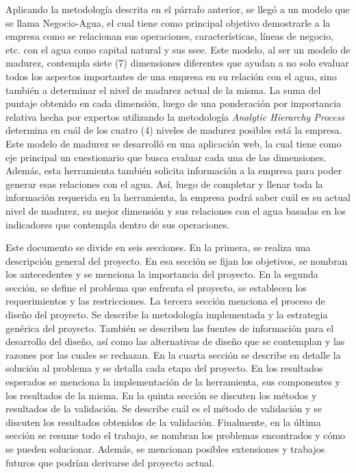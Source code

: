 Aplicando la metodología descrita en el párrafo anterior, se llegó a un modelo que se llama Negocio-Agua, el cual tiene como principal objetivo demostrarle a la empresa como se relacionan sus operaciones, características, líneas de negocio, etc. con el agua como capital natural y sus \acrshort{ssee}. Este modelo, al ser un modelo de madurez, contempla siete (7) dimensiones diferentes que ayudan a no solo evaluar todos los aspectos importantes de una empresa en su relación con el agua, sino también a determinar el nivel de madurez actual de la misma. La suma del puntaje obtenido en cada dimensión, luego de una ponderación por importancia relativa hecha por expertos utilizando la metodología \textit{Analytic Hierarchy Process} \parencite{bahurmoz-2006} determina en cuál de los cuatro (4) niveles de madurez posibles está la empresa. Este modelo de madurez se desarrolló en una aplicación web, la cual tiene como eje principal un cuestionario que busca evaluar cada una de las dimensiones. Además, esta herramienta también solicita información a la empresa para poder generar esas relaciones con el agua. Así, luego de completar y llenar toda la información requerida en la herramienta, la empresa podrá saber cuál es su actual nivel de madurez, su mejor dimensión y sus relaciones con el agua basadas en los indicadores que contempla dentro de sus operaciones. 

\hfill

Este documento se divide en seis secciones. En la primera, se realiza una descripción general del proyecto. En esa sección se fijan los objetivos, se nombran los antecedentes y se menciona la importancia del proyecto. En la segunda sección, se define el problema que enfrenta el proyecto, se establecen los requerimientos y las restricciones. La tercera sección menciona el proceso de diseño del proyecto. Se describe la metodología implementada y la estrategia genérica del proyecto. También se describen las fuentes de información para el desarrollo del diseño, así como las alternativas de diseño que se contemplan y las razones por las cuales se rechazan. En la cuarta sección se describe en detalle la solución al problema y se detalla cada etapa del proyecto. En los resultados esperados se menciona la implementación de la herramienta, sus componentes y los resultados de la misma. En la quinta sección se discuten los métodos y resultados de la validación. Se describe cuál es el método de validación y se discuten los resultados obtenidos de la validación. Finalmente, en la última sección se resume todo el trabajo, se nombran los problemas encontrados y cómo se pueden solucionar. Además, se mencionan posibles extensiones y trabajos futuros que podrían derivarse del proyecto actual.